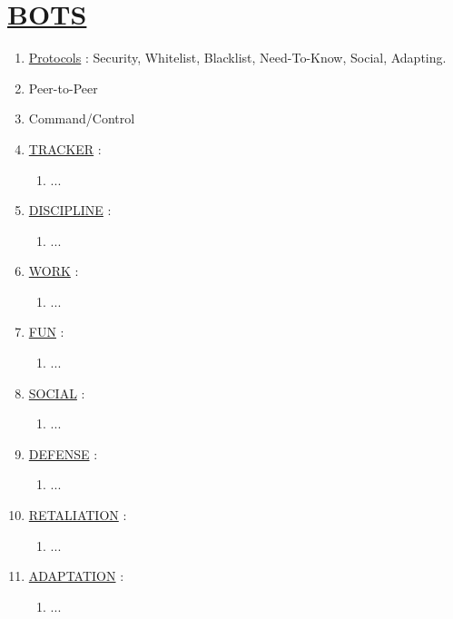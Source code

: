 \documentclass[11pt]{article}
\begin{document}
\section*{\ul{BOTS}}
\begin{enumerate}
	\item[] \ul{Protocols} : Security, Whitelist, Blacklist, Need-To-Know, Social, Adapting.
	\item[] Peer-to-Peer
	\item[] Command/Control
	
	\item[] \ul{TRACKER} :
	\begin{enumerate}
		\item[] ...
	\end{enumerate}

	\item[] \ul{DISCIPLINE} :
	\begin{enumerate}
		\item[] ...
	\end{enumerate}

	\item[] \ul{WORK} :
	\begin{enumerate}
		\item[] ...
	\end{enumerate}

	\item[] \ul{FUN} :
	\begin{enumerate}
		\item[] ...
	\end{enumerate}

	\item[] \ul{SOCIAL} :
	\begin{enumerate}
		\item[] ...
	\end{enumerate}

	\item[] \ul{DEFENSE} :
	\begin{enumerate}
		\item[] ...
	\end{enumerate}

	\item[] \ul{RETALIATION} :
	\begin{enumerate}
		\item[] ...
	\end{enumerate}

	\item[] \ul{ADAPTATION} :
	\begin{enumerate}
		\item[] ...
	\end{enumerate}
\end{enumerate}
\end{document}

